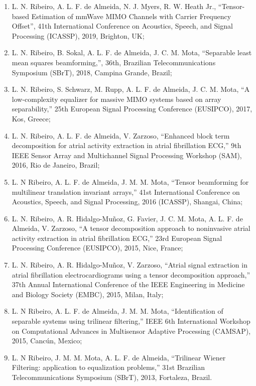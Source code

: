 \begin{enumerate}
	\item L. N. Ribeiro, A. L. F. de Almeida, N. J. Myers, R. W. Heath Jr., ``Tensor-based Estimation of mmWave MIMO Channels with Carrier Frequency Offset'', 41th International Conference on Acoustics, Speech, and Signal Processing (ICASSP), 2019, Brighton, UK;
	
	\item L. N. Ribeiro, B. Sokal, A. L. F. de Almeida, J. C. M. Mota, ``Separable least mean squares beamforming,'', 36th, Brazilian Telecommunications Symposium (SBrT), 2018, Campina Grande, Brazil;
	
	\item L. N. Ribeiro, S. Schwarz, M. Rupp, A. L. F. de Almeida, J. C. M. Mota, ``A low-complexity equalizer for massive MIMO systems based on array separability,'' 25th European Signal Processing Conference (EUSIPCO), 2017, Kos, Greece;
	
	\item L. N. Ribeiro, A. L. F. de Almeida, V. Zarzoso, ``Enhanced block term decomposition for atrial activity extraction in atrial fibrillation ECG,'' 9th IEEE Sensor Array and Multichannel Signal Processing Workshop (SAM), 2016, Rio de Janeiro, Brazil;
	
	\item L. N Ribeiro,  A. L. F. de Almeida, J. M. M. Mota, ``Tensor beamforming for multilinear translation invariant arrays,'' 41st International Conference on Acoustics, Speech, and Signal Processing, 2016 (ICASSP), Shangai, China;
	
	\item  L. N. Ribeiro, A. R. Hidalgo-Mu\~{n}oz, G. Favier, J. C. M. Mota, A. L. F. de Almeida,  V. Zarzoso, ``A tensor decomposition approach to noninvasive atrial activity extraction in atrial fibrillation ECG,'' 23rd European Signal Processing Conference (EUSIPCO), 2015, Nice, France;
	
	\item L. N. Ribeiro, A. R. Hidalgo-Mu\~{n}oz, V. Zarzoso, ``Atrial signal extraction in atrial fibrillation electrocardiograms using a tensor decomposition approach,'' 37th Annual International Conference of the IEEE Engineering in Medicine and Biology Society (EMBC), 2015, Milan, Italy;
	
	 \item L. N Ribeiro,  A. L. F. de Almeida, J. M. M. Mota, ``Identification of separable systems using trilinear filtering,'' IEEE 6th International Workshop on Computational Advances in Multisensor Adaptive Processing (CAMSAP), 2015, Canc\'{u}n, Mexico;
	
	 \item L. N Ribeiro, J. M. M. Mota, A. L. F. de Almeida, ``Trilinear Wiener Filtering: application to equalization problems,''  31st Brazilian Telecommunications Symposium (SBrT), 2013, Fortaleza, Brazil.
\end{enumerate}